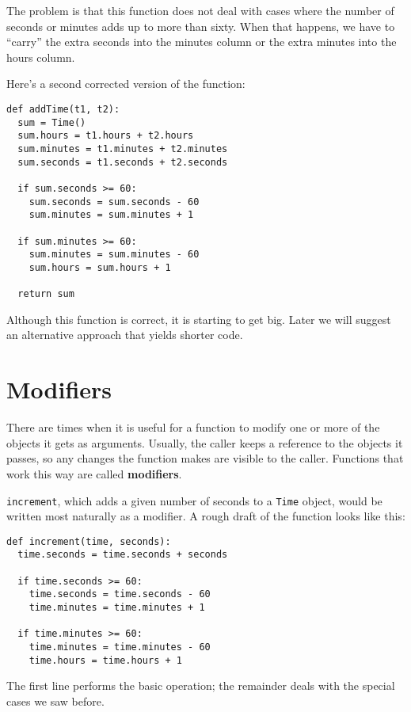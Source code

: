 The problem is that this function does not deal with cases where the
number of seconds or minutes adds up to more than sixty.  When that
happens, we have to ``carry'' the extra seconds into the minutes column
or the extra minutes into the hours column.

Here's a second corrected version of the function:

\beforeverb
\begin{verbatim}
def addTime(t1, t2):
  sum = Time()
  sum.hours = t1.hours + t2.hours
  sum.minutes = t1.minutes + t2.minutes
  sum.seconds = t1.seconds + t2.seconds

  if sum.seconds >= 60:
    sum.seconds = sum.seconds - 60
    sum.minutes = sum.minutes + 1

  if sum.minutes >= 60:
    sum.minutes = sum.minutes - 60
    sum.hours = sum.hours + 1

  return sum
\end{verbatim}
\afterverb
%
Although this function is correct, it is starting to get big.  Later
we will suggest an alternative approach that yields shorter code.


\section{Modifiers}
\label{increment}

There are times when it is useful for a function to modify one or more
of the objects it gets as arguments.  Usually, the caller keeps a
reference to the objects it passes, so any changes the function makes
are visible to the caller.  Functions that work this way are called
{\bf modifiers}.

{\tt increment}, which adds a given number of seconds to a {\tt Time}
object, would be written most naturally as a
modifier.  A rough draft of the function
looks like this:

\pagebreak

\beforeverb
\begin{verbatim}
def increment(time, seconds):
  time.seconds = time.seconds + seconds

  if time.seconds >= 60:
    time.seconds = time.seconds - 60
    time.minutes = time.minutes + 1

  if time.minutes >= 60:
    time.minutes = time.minutes - 60
    time.hours = time.hours + 1
\end{verbatim}
\afterverb
%
The first line performs the basic operation; the remainder deals
with the special cases we saw before.

